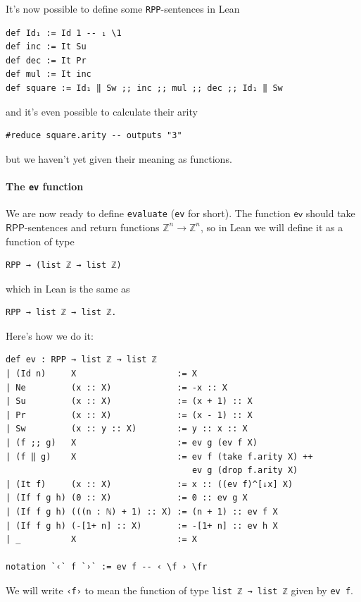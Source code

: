 \documentclass[oneside]{book}
\theoremstyle{definition}
\theoremstyle{remark}
\theoremstyle{plain}
\newcommand{\ZZ}{\mathbb{Z}}
\newcommand{\RPP}{\mathsf{RPP}}
\begin{document}
It's now possible to define some \lstinline{RPP}-sentences in Lean
\begin{lstlisting}
def Id₁ := Id 1 -- ₁ \1
def inc := It Su
def dec := It Pr
def mul := It inc
def square := Id₁ ‖ Sw ;; inc ;; mul ;; dec ;; Id₁ ‖ Sw
\end{lstlisting}
and it's even possible to calculate their arity
\begin{lstlisting}
#reduce square.arity -- outputs "3"
\end{lstlisting}
but we haven't yet given their meaning as functions.

\paragraph{The \lstinline{ev} function}
We are now ready to define \lstinline{evaluate} (\lstinline{ev} for short).
The function $\mathsf{ev}$ should take $\RPP$-sentences and return functions $\ZZ^n \to \ZZ^n$,
so in Lean we will define it as a function of type
\begin{lstlisting}
RPP → (list ℤ → list ℤ)
\end{lstlisting}
which in Lean is the same as
\begin{lstlisting}
RPP → list ℤ → list ℤ.
\end{lstlisting}
Here's how we do it:
\begin{lstlisting}
def ev : RPP → list ℤ → list ℤ
| (Id n)     X                    := X
| Ne         (x :: X)             := -x :: X
| Su         (x :: X)             := (x + 1) :: X
| Pr         (x :: X)             := (x - 1) :: X
| Sw         (x :: y :: X)        := y :: x :: X
| (f ;; g)   X                    := ev g (ev f X)
| (f ‖ g)    X                    := ev f (take f.arity X) ++
                                     ev g (drop f.arity X)
| (It f)     (x :: X)             := x :: ((ev f)^[↓x] X)
| (If f g h) (0 :: X)             := 0 :: ev g X
| (If f g h) (((n : ℕ) + 1) :: X) := (n + 1) :: ev f X
| (If f g h) (-[1+ n] :: X)       := -[1+ n] :: ev h X
| _          X                    := X

notation `‹` f `›` := ev f -- ‹ \f › \fr
\end{lstlisting}
We will write \lstinline{‹f›} to mean the function of type \lstinline{list ℤ → list ℤ} given by \lstinline{ev f}.
\end{document}
